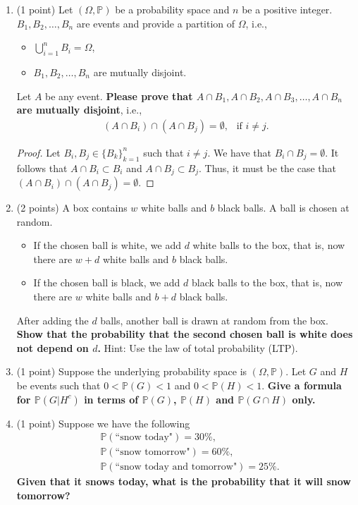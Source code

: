 \documentclass[11pt]{article}
\begin{document}
\begin{enumerate}
\item (1 point) Let $(\Omega,\mathbb{P})$ be a probability space and $n$ be a positive integer. $B_1, B_2,\ldots, B_n$ are events and provide a partition of $\Omega$, i.e.,
\begin{itemize}
    \item $\bigcup_{i=1}^n B_i=\Omega$,
    \item $B_1, B_2,\ldots, B_n$ are mutually disjoint.
\end{itemize}
Let $A$ be any event. \textbf{Please prove that $A\cap B_1, A\cap B_2, A\cap B_3,\ldots, A\cap B_n$ are mutually disjoint}, i.e.,
\begin{align*}
    (A\cap B_i)\cap (A\cap B_j)=\emptyset,\ \ \text{ if }i\ne j.
\end{align*}

\begin{proof}
  Let \(B_i,B_j\in\{B_k\}_{k=1}^n\) such that \(i\neq j\). We have that \(B_i\cap B_j=\emptyset\).
  It follows that \(A\cap B_i\subset B_i\) and \(A\cap B_j\subset B_j\). Thus, it must be the case that
  \((A\cap B_i)\cap(A\cap B_j)=\emptyset\).
\end{proof}

\item (2 points) A box contains $w$ white balls and $b$ black balls.  A ball is chosen at random. 
\begin{itemize}
\item If the chosen ball is white, we add $d$ white balls to the box, that is, now there are $w+d$ white balls and $b$ black balls.
\item If the chosen ball is black, we add $d$ black balls to the box, that is, now there are $w$ white balls and $b+d$ black balls. 
\end{itemize}
After adding the $d$ balls, another ball is drawn at random from the box.  \textbf{Show that the probability that the second chosen ball is white does not depend on $d$.} Hint: Use the law of total probability (LTP).


\item (1 point) Suppose the underlying probability space is $(\Omega,\mathbb{P})$. Let $G$ and $H$ be events such that $0<\mathbb{P}(G)<1$ and $0<\mathbb{P}(H)<1$. \textbf{Give a formula for $\mathbb{P}(G|H^c)$ in terms of $\mathbb{P}(G)$, $\mathbb{P}(H)$ and $\mathbb{P}(G\cap H)$ only.}


\item (1 point) Suppose we have the following
\begin{align*}
    & \mathbb{P}(\text{``snow today"})=30\%, \\
    & \mathbb{P}(\text{``snow tomorrow"})=60\%, \\
    & \mathbb{P}(\text{``snow today and tomorrow"})=25\%.
\end{align*}
\textbf{Given that it snows today, what is the probability that it will snow tomorrow?}



\end{enumerate}
\end{document}
